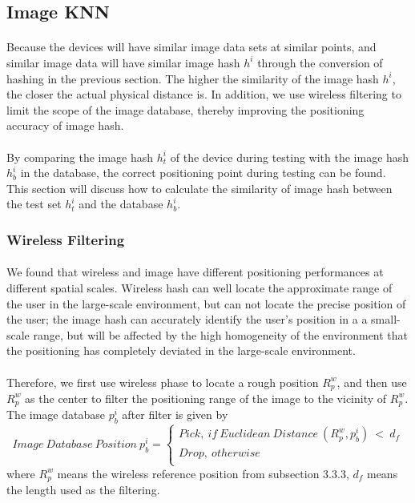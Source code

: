 \documentclass[a4paper,12pt]{report}
\begin{document}
\subsection{Image KNN}

\paragraph{}
Because the devices will have similar image data sets at similar points, and similar image data will have similar image hash $h^{i}$ through the conversion of hashing in the previous section. The higher the similarity of the image hash $h^{i}$, the closer the actual physical distance is. In addition, we use wireless filtering to limit the scope of the image database, thereby improving the positioning accuracy of image hash.
%

\paragraph{}
By comparing the image hash $h_t^{i}$ of the device during testing with the image hash $h_b^{i}$ in the database, the correct positioning point during testing can be found. This section will discuss how to calculate the similarity of image hash between the test set $h_t^{i}$ and the database $h_b^{i}$.
%

\subsubsection{Wireless Filtering}
\paragraph{}
We found that wireless and image have different positioning performances at different spatial scales. Wireless hash can well locate the approximate range of the user in the large-scale environment, but can not locate the precise position of the user; the image hash can accurately identify the user’s position in a a small-scale range, but will be affected by the high homogeneity of the environment that the positioning has completely deviated in the large-scale environment.
%

\paragraph{}
Therefore, we first use wireless phase to locate a rough position $R_p^{w}$, and then use $R_p^{w}$ as the center to filter the positioning range of the image to the vicinity of $R_p^{w}$. The image database $p_b^i$ after filter is given by
\begin{equation}
\label{equation:Wireless_Filtering}
Image\ Database\ Position\ p_b^i = \left\{\begin{matrix}Pick,\ if\ Euclidean\ Distance\ (R_p^{w},p_b^i)\ < \ d_f \\Drop,\ otherwise\\\end{matrix}\right.
\end{equation}
where $R_p^{w}$ means the wireless reference position from subsection 3.3.3, $d_f$ means the length used as the filtering.
\end{document}
